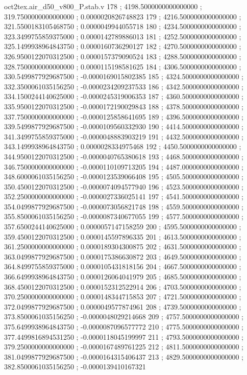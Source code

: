 \begin{filecontents}[overwrite]{oct2tex.air_d50_v800_P.stab.v}
178 ; 4198.5000000000000000 ; 319.7500000000000000 ; 0.0000020826748823
179 ; 4216.5000000000000000 ; 321.5500183105468750 ; 0.0000049944055718
180 ; 4234.5000000000000000 ; 323.3499755859375000 ; 0.0000142789886013
181 ; 4252.5000000000000000 ; 325.1499938964843750 ; 0.0000160736290127
182 ; 4270.5000000000000000 ; 326.9500122070312500 ; 0.0000157379090524
183 ; 4288.5000000000000000 ; 328.7500000000000000 ; 0.0000115198581625
184 ; 4306.5000000000000000 ; 330.5499877929687500 ; -0.0000169015802385
185 ; 4324.5000000000000000 ; 332.3500061035156250 ; -0.0000234209237533
186 ; 4342.5000000000000000 ; 334.1500244140625000 ; -0.0000245319006353
187 ; 4360.5000000000000000 ; 335.9500122070312500 ; -0.0000172190029843
188 ; 4378.5000000000000000 ; 337.7500000000000000 ; -0.0000125858641695
189 ; 4396.5000000000000000 ; 339.5499877929687500 ; -0.0000109560332930
190 ; 4414.5000000000000000 ; 341.3499755859375000 ; -0.0000048883903219
191 ; 4432.5000000000000000 ; 343.1499938964843750 ; 0.0000028334975468
192 ; 4450.5000000000000000 ; 344.9500122070312500 ; -0.0000040765380618
193 ; 4468.5000000000000000 ; 346.7500000000000000 ; -0.0000110109713205
194 ; 4487.0000000000000000 ; 348.6000061035156250 ; -0.0000123539066408
195 ; 4505.5000000000000000 ; 350.4500122070312500 ; -0.0000074094577940
196 ; 4523.5000000000000000 ; 352.2500000000000000 ; -0.0000027336025141
197 ; 4541.5000000000000000 ; 354.0499877929687500 ; -0.0000073056821748
198 ; 4559.5000000000000000 ; 355.8500061035156250 ; -0.0000087340677055
199 ; 4577.5000000000000000 ; 357.6500244140625000 ; 0.0000057147158259
200 ; 4595.5000000000000000 ; 359.4500122070312500 ; 0.0000145597896335
201 ; 4613.5000000000000000 ; 361.2500000000000000 ; 0.0000189304300875
202 ; 4631.5000000000000000 ; 363.0499877929687500 ; 0.0000175386630872
203 ; 4649.5000000000000000 ; 364.8499755859375000 ; 0.0000105431818156
204 ; 4667.5000000000000000 ; 366.6499938964843750 ; 0.0000126064041979
205 ; 4685.5000000000000000 ; 368.4500122070312500 ; 0.0000152312522914
206 ; 4703.5000000000000000 ; 370.2500000000000000 ; 0.0000148344715853
207 ; 4721.5000000000000000 ; 372.0499877929687500 ; 0.0000049577874961
208 ; 4739.5000000000000000 ; 373.8500061035156250 ; -0.0000048029214668
209 ; 4757.5000000000000000 ; 375.6499938964843750 ; -0.0000087096577772
210 ; 4775.5000000000000000 ; 377.4499816894531250 ; -0.0000118045199997
211 ; 4793.5000000000000000 ; 379.2500000000000000 ; -0.0000167489761225
212 ; 4811.5000000000000000 ; 381.0499877929687500 ; -0.0000164315406437
213 ; 4829.5000000000000000 ; 382.8500061035156250 ; -0.0000139410167321

\end{filecontents}
